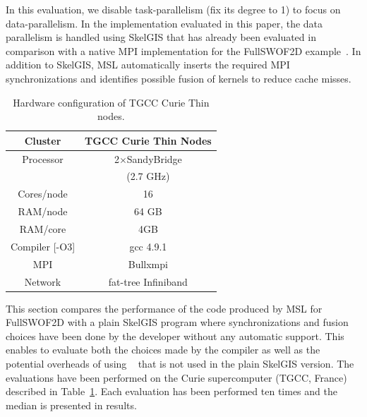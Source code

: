 In this evaluation, we disable task-parallelism (fix its degree to 1) to focus on data-parallelism.
In the implementation evaluated in this paper, the data parallelism is handled using SkelGIS that has already been evaluated in comparison with a native MPI implementation for the FullSWOF2D example~\cite{CPE:CPE3494}.
In addition to SkelGIS, MSL automatically inserts the required MPI synchronizations and identifies possible fusion of kernels to reduce cache misses.

\begin{table}[!ht]
\begin{center}
 \begin{tabular}{|c|c|}
   \hline
    Cluster & \textbf{TGCC Curie Thin Nodes}\\
     \hline         
    Processor & 2$\times$SandyBridge\\
    & (2.7 GHz)\\
    Cores/node & 16 \\
    RAM/node & 64 GB\\
    RAM/core & 4GB\\
    Compiler [-O3] & gcc 4.9.1\\
    MPI & Bullxmpi\\
    Network & fat-tree Infiniband\\
    \hline
 \end{tabular}
 \caption{\label{tab:TGCC}Hardware configuration of TGCC Curie Thin nodes.}
 \end{center}
\end{table}

This section compares the performance of the code produced by MSL for FullSWOF2D with a plain SkelGIS program where synchronizations and fusion choices have been done by the developer without any automatic support.
This enables to evaluate both the choices made by the compiler as well as the potential overheads of using \llc~\cite{l2c} that is not used in the plain SkelGIS version.
The evaluations have been performed on the Curie supercomputer (TGCC, France) described in Table~\ref{tab:TGCC}.
Each evaluation has been performed ten times and the median is presented in results.



